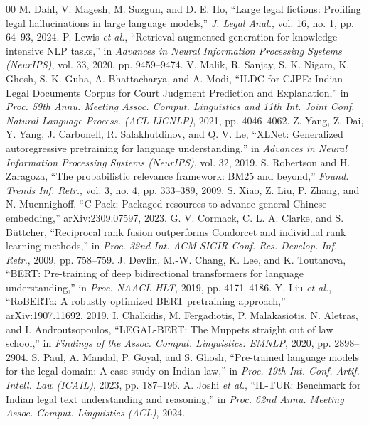 \documentclass[conference]{IEEEtran}
\begin{document}
\begin{thebibliography}{00}
 M. Dahl, V. Magesh, M. Suzgun, and D. E. Ho, ``Large legal fictions: Profiling legal hallucinations in large language models,'' \emph{J. Legal Anal.}, vol. 16, no. 1, pp. 64--93, 2024.
 P. Lewis \emph{et al.}, ``Retrieval-augmented generation for knowledge-intensive NLP tasks,'' in \emph{Advances in Neural Information Processing Systems (NeurIPS)}, vol. 33, 2020, pp. 9459--9474.
 V. Malik, R. Sanjay, S. K. Nigam, K. Ghosh, S. K. Guha, A. Bhattacharya, and A. Modi, ``ILDC for CJPE: Indian Legal Documents Corpus for Court Judgment Prediction and Explanation,'' in \emph{Proc. 59th Annu. Meeting Assoc. Comput. Linguistics and 11th Int. Joint Conf. Natural Language Process. (ACL-IJCNLP)}, 2021, pp. 4046--4062.
 Z. Yang, Z. Dai, Y. Yang, J. Carbonell, R. Salakhutdinov, and Q. V. Le, ``XLNet: Generalized autoregressive pretraining for language understanding,'' in \emph{Advances in Neural Information Processing Systems (NeurIPS)}, vol. 32, 2019.
 S. Robertson and H. Zaragoza, ``The probabilistic relevance framework: BM25 and beyond,'' \emph{Found. Trends Inf. Retr.}, vol. 3, no. 4, pp. 333--389, 2009.
 S. Xiao, Z. Liu, P. Zhang, and N. Muennighoff, ``C-Pack: Packaged resources to advance general Chinese embedding,'' arXiv:2309.07597, 2023.
 G. V. Cormack, C. L. A. Clarke, and S. B\"{u}ttcher, ``Reciprocal rank fusion outperforms Condorcet and individual rank learning methods,'' in \emph{Proc. 32nd Int. ACM SIGIR Conf. Res. Develop. Inf. Retr.}, 2009, pp. 758--759.
 J. Devlin, M.-W. Chang, K. Lee, and K. Toutanova, ``BERT: Pre-training of deep bidirectional transformers for language understanding,'' in \emph{Proc. NAACL-HLT}, 2019, pp. 4171--4186.
 Y. Liu \emph{et al.}, ``RoBERTa: A robustly optimized BERT pretraining approach,'' arXiv:1907.11692, 2019.
 I. Chalkidis, M. Fergadiotis, P. Malakasiotis, N. Aletras, and I. Androutsopoulos, ``LEGAL-BERT: The Muppets straight out of law school,'' in \emph{Findings of the Assoc. Comput. Linguistics: EMNLP}, 2020, pp. 2898--2904.
 S. Paul, A. Mandal, P. Goyal, and S. Ghosh, ``Pre-trained language models for the legal domain: A case study on Indian law,'' in \emph{Proc. 19th Int. Conf. Artif. Intell. Law (ICAIL)}, 2023, pp. 187--196.
 A. Joshi \emph{et al.}, ``IL-TUR: Benchmark for Indian legal text understanding and reasoning,'' in \emph{Proc. 62nd Annu. Meeting Assoc. Comput. Linguistics (ACL)}, 2024.

\end{thebibliography}
\end{document}
